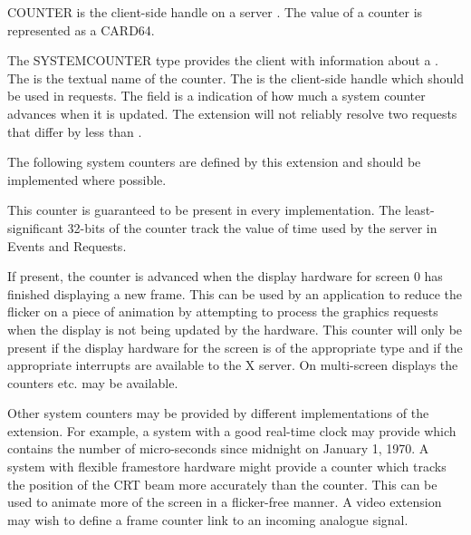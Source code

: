 COUNTER is the client-side handle on a server . The value of a
counter is represented as a CARD64.

The SYSTEMCOUNTER type provides the client with information about a
. The  is the textual name of the counter.
The  is the client-side handle which should be used in
 requests. The  field is a indication
of how much a system counter advances when it is updated. The
extension will not reliably resolve two  requests that
differ by less than .

The following system counters are defined by this extension and
should be implemented where possible.

\begin{description}

\item{}

This counter is guaranteed to be present in every implementation. The
least-significant 32-bits of the counter track the value of time used
by the server in Events and Requests.

\item{}

If present, the  counter is advanced when the
display hardware for screen 0 has finished displaying a new frame.
This can be used by an application to reduce the flicker on a piece of
animation by attempting to process the graphics requests when the
display is not being updated by the hardware. This counter will only
be present if the display hardware for the screen is of the
appropriate type and if the appropriate interrupts are available to
the X server. On multi-screen displays the counters 
etc. may be available.

\end{description}

Other system counters may be provided by different implementations of the
extension.  For example, a system with a good real-time clock may provide
 which contains the number of micro-seconds since midnight on
January 1, 1970. A system with flexible framestore hardware might provide a
 counter which tracks the position of the CRT beam more
accurately than the  counter. This can be used to animate
more of the screen in a flicker-free manner. A video extension may wish to
define a frame counter link to an incoming analogue signal.

